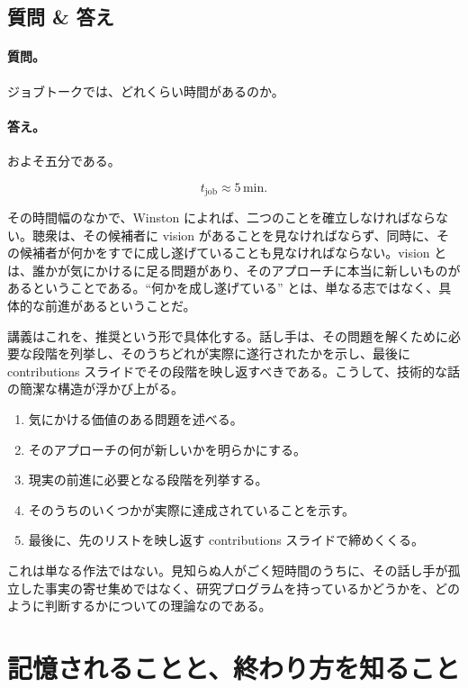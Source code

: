 \subsection{質問 \& 答え}

\paragraph{質問。} ジョブトークでは、どれくらい時間があるのか。

\paragraph{答え。} およそ五分である。

\begin{equation}
t_{\mathrm{job}} \approx 5\,\mathrm{min}.
\end{equation}

その時間幅のなかで、Winston によれば、二つのことを確立しなければならない。聴衆は、その候補者に vision があることを見なければならず、同時に、その候補者が何かをすでに成し遂げていることも見なければならない。vision とは、誰かが気にかけるに足る問題があり、そのアプローチに本当に新しいものがあるということである。``何かを成し遂げている'' とは、単なる志ではなく、具体的な前進があるということだ。

講義はこれを、推奨という形で具体化する。話し手は、その問題を解くために必要な段階を列挙し、そのうちどれが実際に遂行されたかを示し、最後に contributions スライドでその段階を映し返すべきである。こうして、技術的な話の簡潔な構造が浮かび上がる。

\begin{enumerate}
\item 気にかける価値のある問題を述べる。
\item そのアプローチの何が新しいかを明らかにする。
\item 現実の前進に必要となる段階を列挙する。
\item そのうちのいくつかが実際に達成されていることを示す。
\item 最後に、先のリストを映し返す contributions スライドで締めくくる。
\end{enumerate}

これは単なる作法ではない。見知らぬ人がごく短時間のうちに、その話し手が孤立した事実の寄せ集めではなく、研究プログラムを持っているかどうかを、どのように判断するかについての理論なのである。

\section{記憶されることと、終わり方を知ること}

